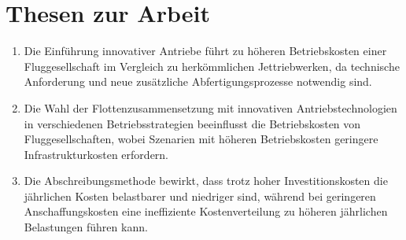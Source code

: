 \chapter*{Thesen zur Arbeit}
\label{ch:Thesen}
\thispagestyle{empty}

\begin{enumerate}
    \item Die Einführung innovativer Antriebe führt zu höheren Betriebskosten einer Fluggesellschaft im Vergleich zu herkömmlichen
    Jettriebwerken, da technische Anforderung und neue zusätzliche Abfertigungsprozesse notwendig sind.
    \item Die Wahl der Flottenzusammensetzung mit innovativen Antriebstechnologien in verschiedenen 
    Betriebsstrategien beeinflusst die Betriebskosten von Fluggesellschaften, wobei Szenarien mit höheren 
    Betriebskosten geringere Infrastrukturkosten erfordern.
    \item Die Abschreibungsmethode bewirkt, dass trotz hoher Investitionskosten die jährlichen Kosten belastbarer 
    und niedriger sind, während bei geringeren Anschaffungskosten eine ineffiziente Kostenverteilung zu 
    höheren jährlichen Belastungen führen kann.
\end{enumerate}


